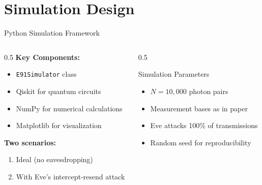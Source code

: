\documentclass[10pt]{beamer}
\begin{document}
\section{Simulation Design}

\begin{frame}{Python Simulation Framework}
    \begin{columns}
        \begin{column}{0.5\textwidth}
            \textbf{Key Components:}
            \begin{itemize}
                \item \texttt{E91Simulator} class
                \item Qiskit for quantum circuits
                \item NumPy for numerical calculations
                \item Matplotlib for visualization
            \end{itemize}
            
            \vspace{3mm}
            \textbf{Two scenarios:}
            \begin{enumerate}
                \item Ideal (no eavesdropping)
                \item With Eve's intercept-resend attack
            \end{enumerate}
        \end{column}
        
        \begin{column}{0.5\textwidth}
            \begin{block}{Simulation Parameters}
                \begin{itemize}
                    \item $N = 10,000$ photon pairs
                    \item Measurement bases as in paper
                    \item Eve attacks 100\% of transmissions
                    \item Random seed for reproducibility
                \end{itemize}
            \end{block}
        \end{column}
    \end{columns}
\end{frame}
\end{document}
